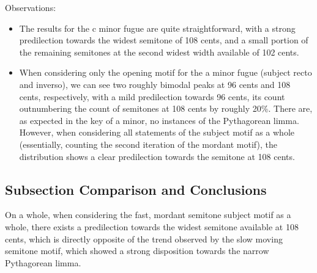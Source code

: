     \begin{center}
    \end{center}
    

    \begin{center}
    \end{center}
    
    Observations:

\begin{itemize}
\tightlist
\item
  The results for the c minor fugue are quite straightforward, with a
  strong predilection towards the widest semitone of 108 cents, and a
  small portion of the remaining semitones at the second widest width
  available of 102 cents.
\item
  When considering only the opening motif for the a minor fugue (subject
  recto and inverso), we can see two roughly bimodal peaks at 96 cents
  and 108 cents, respectively, with a mild predilection towards 96
  cents, its count outnumbering the count of semitones at 108 cents by
  roughly 20\%. There are, as expected in the key of a minor, no
  instances of the Pythagorean limma. However, when considering all
  statements of the subject motif as a whole (essentially, counting the
  second iteration of the mordant motif), the distribution shows a clear
  predilection towards the semitone at 108 cents.
\end{itemize}

\subsection{Subsection Comparison and
Conclusions}\label{subsection-comparison-and-conclusions}

On a whole, when considering the fast, mordant semitone subject motif as
a whole, there exists a predilection towards the widest semitone
available at 108 cents, which is directly opposite of the trend observed
by the slow moving semitone motif, which showed a strong disposition
towards the narrow Pythagorean limma.


    \begin{center}
    \end{center}
    
